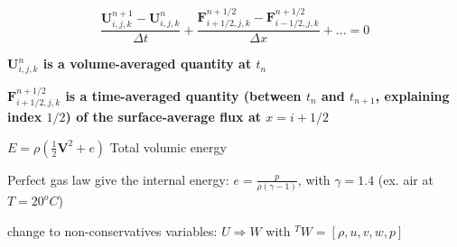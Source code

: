 \begin{frame}
\begin{itemize}
{  \begin{equation*} 
    \frac{\mathbf{U}_{i,j,k}^{n+1}-\mathbf{U}_{i,j,k}^{n}}{\Delta t} +
    \frac{\mathbf{F}_{i+1/2,j,k}^{n+1/2}-\mathbf{F}_{i-1/2,j,k}^{n+1/2}}{\Delta x}  + ... = 0
  \end{equation*}
\item \textbf{$\mathbf{U}_{i,j,k}^{n}$ is a volume-averaged quantity at $t_n$}
\item \textbf{$\mathbf{F}_{i+1/2,j,k}^{n+1/2}$ is a time-averaged quantity (between $t_n$ and $t_{n+1}$, explaining index $1/2$) of the surface-average flux at $x=i+1/2$}
\item $E=\rho(\frac{1}{2}\mathbf{V}^2+e)$ Total volumic energy
\item Perfect gas law give the internal energy:
  $e=\frac{p}{\rho(\gamma-1)}$, with $\gamma=1.4$ (ex. air at $T=20^oC$)
\item {\small change to non-conservatives variables: $U \Rightarrow W$ with $^TW=[\rho, u, v, w, p]$}
}
\end{itemize}

\end{frame}

